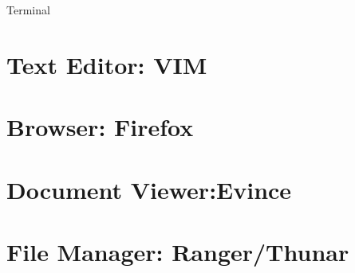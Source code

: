 Terminal 





\section{Text Editor: VIM}
\label{3.4}




\section{Browser: Firefox}
\label{3.5}





\section{Document Viewer:Evince}
\label{3.6}









\section{File Manager: Ranger/Thunar}
\label{3.7}
